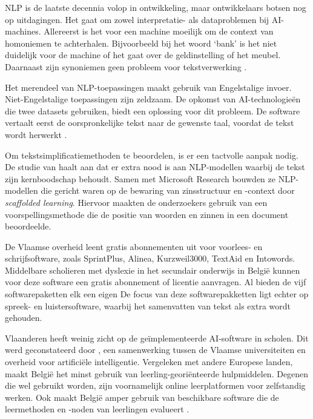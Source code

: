 NLP is de laatste decennia volop in ontwikkeling, maar ontwikkelaars botsen nog op uitdagingen. Het gaat om zowel interpretatie- als dataproblemen bij AI-machines. Allereerst is het voor een machine moeilijk om de context van homoniemen te achterhalen. Bijvoorbeeld bij het woord ‘bank’ is het niet duidelijk voor de machine of het gaat over de geldinstelling of het meubel. Daarnaast zijn synoniemen geen probleem voor tekstverwerking \autocite{Roldos2020}.

Het merendeel van NLP-toepassingen maakt gebruik van Engelstalige invoer. Niet-Engelstalige toepassingen zijn zeldzaam. De opkomst van AI-technologieën die twee datasets gebruiken, biedt een oplossing voor dit probleem. De software vertaalt eerst de oorspronkelijke tekst naar de gewenste taal, voordat de tekst wordt herwerkt \autocite{Sciforce2020}.

Om tekstsimplificatiemethoden te beoordelen, is er een tactvolle aanpak nodig. De studie van \textcite{Swayamdipta2019} haalt aan dat er extra nood is aan NLP-modellen waarbij de tekst zijn kernboodschap behoudt. Samen met Microsoft Research bouwden ze NLP-modellen die gericht waren op de bewaring van zinsstructuur en -context door \emph{scaffolded learning}. Hiervoor maakten de onderzoekers gebruik van een voorspellingsmethode die de positie van woorden en zinnen in een document beoordeelde.

De Vlaamse overheid leent gratis abonnementen uit voor voorlees- en schrijfsoftware, zoals SprintPlus, Alinea, Kurzweil3000, TextAid en Intowords. Middelbare scholieren met dyslexie in het secundair onderwijs in België kunnen voor deze software een gratis abonnement of licentie aanvragen. Al bieden de vijf softwarepaketten elk een eigen De focus van deze softwarepakketten ligt echter op spreek- en luistersoftware, waarbij het samenvatten van tekst als extra wordt gehouden.

Vlaanderen heeft weinig zicht op de geïmplementeerde AI-software in scholen. Dit werd geconstateerd door \autocite{Martens2021}, een samenwerking tussen de Vlaamse universiteiten en overheid voor artificiële intelligentie. Vergeleken met andere Europese landen, maakt België het minst gebruik van leerling-georiënteerde hulpmiddelen. Degenen die wel gebruikt worden, zijn voornamelijk online leerplatformen voor zelfstandig werken. Ook maakt België amper gebruik van beschikbare software die de leermethoden en -noden van leerlingen evalueert \autocite{Martens2021a}. 


